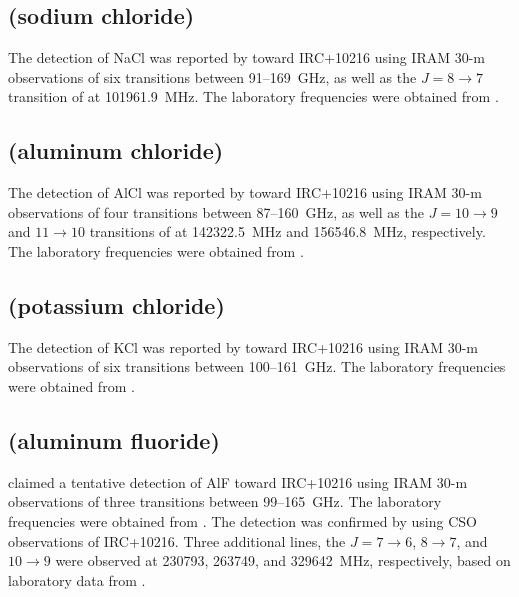 \documentclass[twocolumn]{aastex631}
\begin{document}
    \subsection{ (sodium chloride)}
    \label{NaCl}
    
    The detection of NaCl was reported by \citet{Cernicharo:1987wp} toward IRC+10216 using IRAM 30-m observations of six transitions between 91--169~GHz, as well as the $J=8\rightarrow7$ transition of  at 101961.9~MHz.  The laboratory frequencies were obtained from \citet{Lovas:1974co}. 
    
    \subsection{ (aluminum chloride)}
    \label{AlCl}
    
    The detection of AlCl was reported by \citet{Cernicharo:1987wp} toward IRC+10216 using IRAM 30-m observations of four transitions between 87--160~GHz, as well as the $J=10\rightarrow9$ and $11\rightarrow10$ transitions of  at 142322.5~MHz and 156546.8~MHz, respectively.  The laboratory frequencies were obtained from \citet{Lovas:1974co}.     
    
    \subsection{ (potassium chloride)}
    \label{KCl}
    
    The detection of KCl was reported by \citet{Cernicharo:1987wp} toward IRC+10216 using IRAM 30-m observations of six transitions between 100--161~GHz.  The laboratory frequencies were obtained from \citet{Lovas:1974co}.      
    
    \subsection{ (aluminum fluoride)}
    \label{AlF}
    
    \citet{Cernicharo:1987wp} claimed a tentative detection of AlF toward IRC+10216 using IRAM 30-m observations of three transitions between 99--165~GHz.  The laboratory frequencies were obtained from \citet{Lovas:1974co}. The detection was confirmed by \citet{Ziurys:1994kw} using CSO observations of IRC+10216.  Three additional lines, the $J=7\rightarrow6$, $8\rightarrow7$, and $10\rightarrow9$ were observed at 230793, 263749, and 329642~MHz, respectively, based on laboratory data from \citet{Wyse:1970ex}.
    
\end{document}
